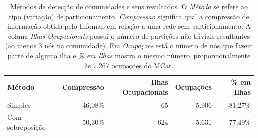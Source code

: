\documentclass[12pt,a4paper]{article}
\begin{document}

\begin{table}
    \centering
    \begin{tabular}{@{} l r r r r @{}}
        \toprule
        Método           & Compressão & Ilhas Ocupacionais & Ocupações & \% em Ilhas \\ \midrule
        Simples          & 46,08\%    & 65                 & 5.906     & 81,27\%     \\
        Com sobreposição & 50,30\%    & 624                & 5.631     & 77,49\%     \\ \bottomrule
    \end{tabular}
    \caption{Métodos de detecção de comunidades e seus resultados. O \textit{Método} se refere ao tipo (variação) de particionamento. \textit{Compressão} significa qual a compressão de informação obtida pelo Infomap em relação a uma rede sem particionamento. A coluna \textit{Ilhas Ocupacionais} possui o número de partições não-triviais resultantes (ao menos 3 nós na comunidade). Em \textit{Ocupações} está o número de nós que fazem parte de alguma ilha e \textit{\% em Ilhas} mostra o mesmo número, proporcionalmente às 7.267 ocupações do MCar.}
    \label{tab:metodos}
\end{table}
\end{document}
